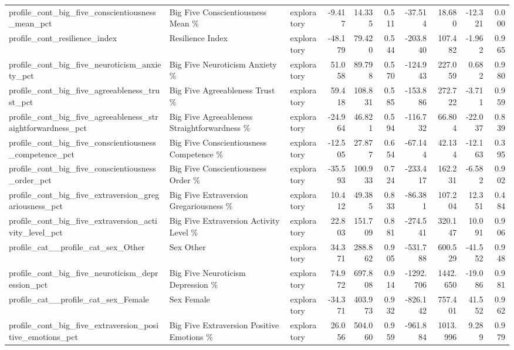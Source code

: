 \begin{table}[htbp]
\begin{threeparttable}
\begin{tabular}{lllrrrrrrr}
profile\_cont\_big\_five\_conscientiousness\_mean\_pct & Big Five Conscientiousness Mean \% & exploratory & -9.417 & 14.335 & 0.511 & -37.514 & 18.680 & -12.321 & 0.000 \\
profile\_cont\_resilience\_index & Resilience Index & exploratory & -48.179 & 79.420 & 0.544 & -203.840 & 107.482 & -1.962 & 0.965 \\
profile\_cont\_big\_five\_neuroticism\_anxiety\_pct & Big Five Neuroticism Anxiety \% & exploratory & 51.058 & 89.798 & 0.570 & -124.943 & 227.059 & 0.682 & 0.980 \\
profile\_cont\_big\_five\_agreeableness\_trust\_pct & Big Five Agreeableness Trust \% & exploratory & 59.418 & 108.831 & 0.585 & -153.886 & 272.722 & -3.711 & 0.959 \\
profile\_cont\_big\_five\_agreeableness\_straightforwardness\_pct & Big Five Agreeableness Straightforwardness \% & exploratory & -24.964 & 46.821 & 0.594 & -116.732 & 66.804 & -22.037 & 0.839 \\
profile\_cont\_big\_five\_conscientiousness\_competence\_pct & Big Five Conscientiousness Competence \% & exploratory & -12.505 & 27.877 & 0.654 & -67.144 & 42.134 & -12.163 & 0.395 \\
profile\_cont\_big\_five\_conscientiousness\_order\_pct & Big Five Conscientiousness Order \% & exploratory & -35.593 & 100.933 & 0.724 & -233.417 & 162.231 & -6.582 & 0.902 \\
profile\_cont\_big\_five\_extraversion\_gregariousness\_pct & Big Five Extraversion Gregariousness \% & exploratory & 10.412 & 49.385 & 0.833 & -86.381 & 107.204 & 12.351 & 0.484 \\
profile\_cont\_big\_five\_extraversion\_activity\_level\_pct & Big Five Extraversion Activity Level \% & exploratory & 22.803 & 151.709 & 0.881 & -274.541 & 320.147 & 10.091 & 0.906 \\
profile\_cat\_\_profile\_cat\_sex\_Other & Sex Other & exploratory & 34.371 & 288.862 & 0.905 & -531.788 & 600.529 & -41.552 & 0.948 \\
profile\_cont\_big\_five\_neuroticism\_depression\_pct & Big Five Neuroticism Depression \% & exploratory & 74.972 & 697.808 & 0.914 & -1292.706 & 1442.650 & -19.086 & 0.981 \\
profile\_cat\_\_profile\_cat\_sex\_Female & Sex Female & exploratory & -34.371 & 403.973 & 0.932 & -826.142 & 757.401 & 41.552 & 0.962 \\
profile\_cont\_big\_five\_extraversion\_positive\_emotions\_pct & Big Five Extraversion Positive Emotions \% & exploratory & 26.056 & 504.060 & 0.959 & -961.884 & 1013.996 & 9.289 & 0.979 \\

\end{tabular}
\end{threeparttable}
\end{table}
